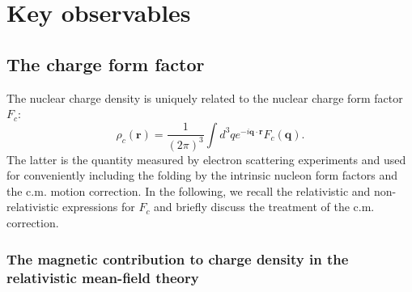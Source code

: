 \documentclass[aps,prc,twocolumn,floatfix,nofootinbib,preprintnumbers,superscriptaddress,longbibliography]{revtex4-1}
\renewcommand{\vec}{\boldsymbol}
\begin{document}
\section{Key observables}\label{sec:Def}
\subsection{The charge form factor}

The nuclear charge density is uniquely related to the  nuclear charge form factor $F_c$:
\begin{equation}\label{eq:rhoc}
 \rho_c(\vec{r}) =\frac{1}{(2\pi)^3}\int d^3q 
    e^{-i\vec{q}\cdot\vec{r}}F_c(\vec{q}).
\end{equation}
The latter is the quantity measured by electron scattering experiments \cite{deForest1966} and used for conveniently including the folding by the intrinsic nucleon form factors and the c.m.  motion correction.
In the following, we recall the relativistic and non-relativistic expressions for $F_c$ and briefly discuss the treatment of the c.m. correction.

\subsubsection{The magnetic contribution to charge density in the relativistic mean-field
  theory}
\end{document}
